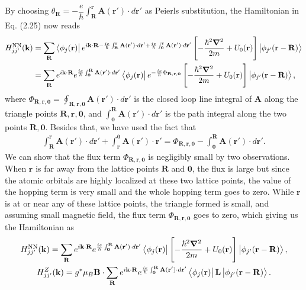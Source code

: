 \documentclass{report}
\newcommand{\f}[2]{\dfrac{#1}{#2}}
\begin{document}
By choosing $\theta_{\mathbf{R}} = - \f{e}{\hbar} \int_{\mathbf{R}}^{\mathbf{r}} \mathbf{A(\mathbf{r'})} \cdot d\mathbf{r'}$ as Peierls substitution, the Hamiltonian in Eq. (2.25) now reads
\begin{equation}
	\begin{aligned}
		H_{jj'}^{\text{NN}}(\mathbf{k})
		 & = \sum_{\mathbf{R}} \bra{\phi_{j}(\mathbf{r})} e^{i\mathbf{k \cdot R} - \frac{ie}{\hbar} \int_{\mathbf{R}}^{\mathbf{r}} \mathbf{A}(\mathbf{r'}) \cdot d\mathbf{r'} + \frac{ie}{\hbar}\int_{\mathbf{0}}^{\mathbf{r}}\mathbf{A(\mathbf{r'})}\cdot d\mathbf{r'} } \left[- \f{\hbar^{2} \boldsymbol{\nabla}^{2}}{2m} + U_{0} (\mathbf{r}) \right] \ket{\phi_{j'}(\mathbf{r - R})} \nonumber \\
		 & = \sum_{\mathbf{R}}  e^{i\mathbf{k \cdot R}} e^{\frac{ie}{\hbar} \int_{\mathbf{0}}^{\mathbf{R}} \mathbf{A(\mathbf{r'})} \cdot d \mathbf{r'} } \bra{\phi_{j}(\mathbf{r})} e^{-\frac{ie}{\hbar} \Phi_{\mathbf{R,r,0}}} \left[ -\f{\hbar^{2} \boldsymbol{\nabla}^{2}}{2m} + U_{0} (\mathbf{r}) \right] \ket{\phi_{j'}(\mathbf{r - R})},
	\end{aligned}
\end{equation}
where $\Phi_{\mathbf{R,r,0}} = \oint_{\mathbf{R,r,0}} \mathbf{A(\mathbf{r'})} \cdot d\mathbf{r'} $ is the closed loop line integral of $\mathbf{A}$ along the triangle points $\mathbf{R,r,0}$, and $\int_{\mathbf{0}}^{\mathbf{R}} \mathbf{A(\mathbf{r'})} \cdot d \mathbf{r'}$ is the path integral along the two points $\mathbf{R,0}$. Besides that, we have used the fact that
\begin{align}
	\int_{\mathbf{R}}^{\mathbf{r}} \mathbf{A(\mathbf{r'})} \cdot d\mathbf{r'} + \int_{\mathbf{r}}^{\mathbf{0}} \mathbf{A(r')} \cdot \mathbf{r'} = \Phi_{\mathbf{R,r,0}} - \int_{\mathbf{0}}^{\mathbf{R}} \mathbf{A(\mathbf{r'})} \cdot d \mathbf{r'}.
\end{align}
We can show that the flux term $\Phi_{\mathbf{R,r,0}}$ is negligibly small \cite{yalcin_2019} by two observations. When $\mathbf{r}$ is far away from the lattice points $\mathbf{R}$ and $\mathbf{0}$, the flux is large but since the atomic orbitals are highly localized at these two lattice points, the value of the hopping term is very small and the whole hopping term goes to zero. While $\mathbf{r}$ is at or near any of these lattice points, the triangle formed is small, and assuming small magnetic field, the flux term $\Phi_{\mathbf{R,r,0}}$ goes to zero, which giving us the Hamiltonian as
\begin{gather}
	H_{jj'}^{\text{NN}}(\mathbf{k})
	= \sum_{\mathbf{R}} e^{i\mathbf{k \cdot R}}e^{\frac{ie}{\hbar} \int_{\mathbf{0}}^{\mathbf{R}} \mathbf{A(\mathbf{r'})} \cdot d \mathbf{r'} } \bra{\phi_{j}(\mathbf{r})} \left[ -\f{\hbar^{2} \boldsymbol{\nabla}^{2}}{2m} + U_{0} (\mathbf{r}) \right] \ket{\phi_{j'}(\mathbf{r - R})},\\
	H_{jj'}^{Z}(\mathbf{k})
	= g^{*} \mu_{B} \mathbf{B} \cdot \sum_{\mathbf{R}} e^{i\mathbf{k \cdot R}}e^{\frac{ie}{\hbar} \int_{\mathbf{0}}^{\mathbf{R}} \mathbf{A(\mathbf{r'})} \cdot d \mathbf{r'}} \bra{\phi_{j}(\mathbf{r})} \mathbf{L} \ket{\phi_{j'}(\mathbf{r - R})}.
\end{gather}
\end{document}
